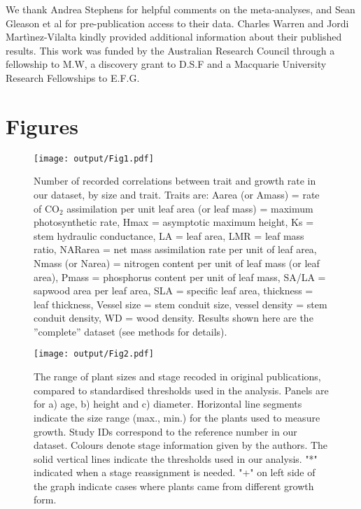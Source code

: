 \documentclass[a4paper,11pt]{article}
\begin{document}
We thank Andrea Stephens for helpful comments on the meta-analyses, and Sean Gleason et al for pre-publication access to their data. Charles Warren and Jordi Martìnez-Vilalta kindly provided additional information about their published results. This work was funded by the Australian Research Council through a fellowship to M.W, a discovery grant to D.S.F and a Macquarie University Research Fellowships to E.F.G.

\clearpage
\linespread{1}

\nocite{*}

\label{references}


\clearpage
\section*{Figures}

\begin{figure}[h!]
\centering
\texttt{[image: output/Fig1.pdf]}
\caption{Number of recorded correlations between trait and growth rate in our dataset, by size and trait. Traits are: Aarea (or Amass) = rate of CO$_{2}$ assimilation per unit leaf area (or leaf mass) = maximum photosynthetic rate, Hmax = asymptotic maximum height,  Ks = stem hydraulic conductance, LA = leaf area, LMR = leaf mass ratio, NARarea = net mass assimilation rate per unit of leaf area, Nmass (or Narea) = nitrogen content per unit of leaf mass (or leaf area), Pmass = phosphorus content per unit of leaf mass, SA/LA = sapwood area per leaf area, SLA = specific leaf area, thickness = leaf thickness, Vessel size = stem conduit size, vessel density = stem conduit density, WD = wood density. Results shown here are the ''complete'' dataset (see methods for details).}
\label{fig:fig1}
\end{figure}

\begin{figure}[h!]
\centering
\texttt{[image: output/Fig2.pdf]}
\caption{The range of plant sizes and stage recoded in original publications, compared to standardised thresholds used in the analysis. Panels are for
a) age, b) height and c) diameter. Horizontal line segments indicate the size range (max., min.) for the plants used to measure growth. Study IDs correspond to the reference number in our dataset. Colours denote stage information given by the authors. The solid vertical lines indicate the thresholds used in our analysis. "*" indicated when a stage reassignment is needed. "+" on left side of the graph indicate cases where plants came from different growth form.}
\label{fig:fig2}
\end{figure}
\end{document}
